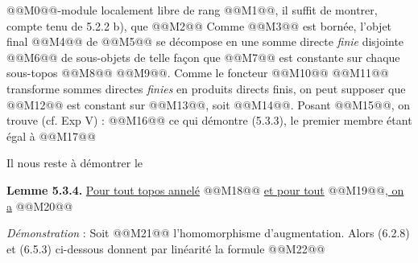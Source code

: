 
@@M0@@-module localement libre de rang @@M1@@, il suffit de montrer, compte tenu de 5.2.2 b), que
@@M2@@
Comme @@M3@@ est bornée, l'objet final @@M4@@ de @@M5@@ se décompose en une somme directe \emph{finie} disjointe @@M6@@ de sous-objets de telle façon que @@M7@@ est constante sur chaque sous-topos @@M8@@ @@M9@@. Comme le foncteur @@M10@@ @@M11@@ transforme sommes directes \emph{finies} en produits directs finis, on peut supposer que @@M12@@ est constant sur @@M13@@, soit @@M14@@. Posant @@M15@@, on trouve (cf. Exp V) :
@@M16@@
ce qui démontre (5.3.3), le premier membre étant égal à
@@M17@@

Il nous reste à démontrer le

\textbf{Lemme 5.3.4.} \uline{Pour tout topos annelé} @@M18@@ \uline{et pour tout} @@M19@@\uline{, on a}
@@M20@@

\emph{Démonstration} : Soit @@M21@@ l'homomorphisme d'augmentation. Alors (6.2.8) et (6.5.3) ci-dessous donnent par linéarité la formule
@@M22@@
